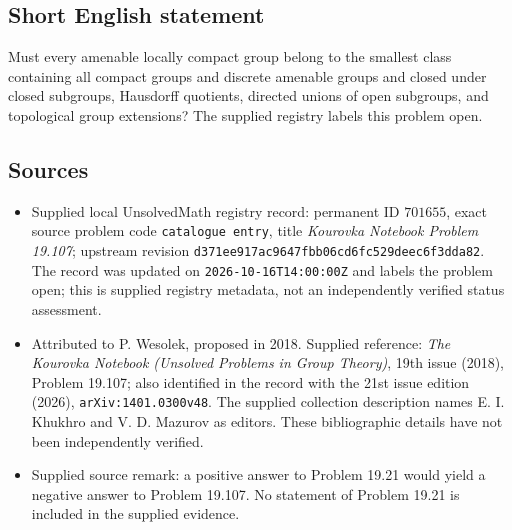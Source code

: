 \documentclass[11pt]{article}
\begin{document}
\subsection{Short English statement}
Must every amenable locally compact group belong to the smallest class containing all compact groups and discrete amenable groups and closed under closed subgroups, Hausdorff quotients, directed unions of open subgroups, and topological group extensions? The supplied registry labels this problem open.
\subsection{Sources}
\begin{itemize}
\item Supplied local UnsolvedMath registry record: permanent ID \(701655\), exact source problem code \texttt{catalogue entry}, title \emph{Kourovka Notebook Problem 19.107}; upstream revision \texttt{d371ee917ac9647fbb06cd6fc529deec6f3dda82}. The record was updated on \texttt{2026-10-16T14:00:00Z} and labels the problem open; this is supplied registry metadata, not an independently verified status assessment.
\item Attributed to P. Wesolek, proposed in 2018. Supplied reference: \emph{The Kourovka Notebook (Unsolved Problems in Group Theory)}, 19th issue (2018), Problem 19.107; also identified in the record with the 21st issue edition (2026), \texttt{arXiv:1401.0300v48}. The supplied collection description names E. I. Khukhro and V. D. Mazurov as editors. These bibliographic details have not been independently verified.
\item Supplied source remark: a positive answer to Problem 19.21 would yield a negative answer to Problem 19.107. No statement of Problem 19.21 is included in the supplied evidence.
\end{itemize}
\end{document}
